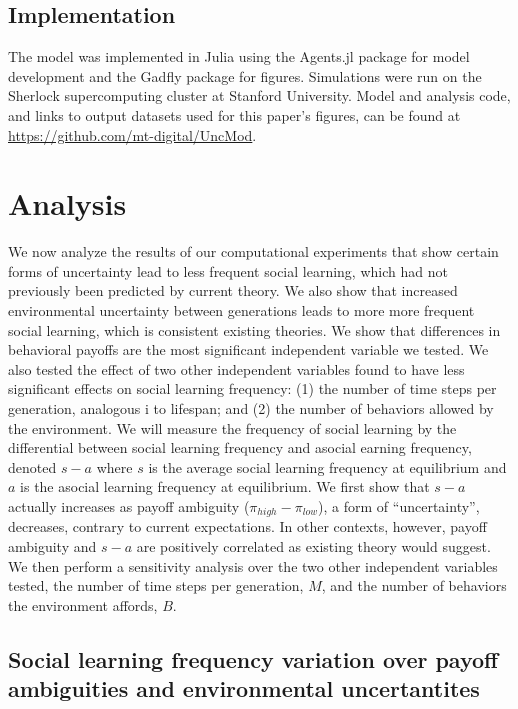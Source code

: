 \documentclass[10pt,letterpaper]{article}
\begin{document}
\subsection{Implementation}

The model was implemented in Julia using the Agents.jl package for model development
and the Gadfly package for figures. Simulations were run on the Sherlock supercomputing
cluster at Stanford University. Model and analysis code, and links to output 
datasets used for this paper's figures, can be found 
at \url{https://github.com/mt-digital/UncMod}.


\section{Analysis}


We now analyze the results of our computational experiments that show certain forms
of uncertainty lead to less frequent social learning, which had not previously been
predicted by current theory. We also show that increased environmental
uncertainty between generations leads to more more frequent social learning,
which is consistent existing theories. We show that differences in behavioral payoffs
are the most significant independent variable we tested. We also tested the effect
of two other independent variables found to have less significant effects on
social learning frequency: (1) the number of time steps per generation, analogous i
to lifespan; and (2) the number of behaviors allowed by the environment. 
We will measure the frequency of social learning by the differential between
social learning frequency and asocial earning frequency, denoted $s - a$ where
$s$ is the average social learning frequency at equilibrium and $a$ is the 
asocial learning frequency at equilibrium. We first show that $s-a$ actually
increases as payoff ambiguity ($\pi_{high} - \pi_{low}$), a form of ``uncertainty'',
decreases, contrary to current expectations. In other contexts, however, 
payoff ambiguity and $s-a$ are positively correlated as existing theory would
suggest. We then perform a sensitivity analysis over the two other independent
variables tested, the number of time steps per generation, $M$, and the number
of behaviors the environment affords, $B$.
 
\subsection{Social learning frequency variation over payoff 
  ambiguities and environmental uncertantites}
  \vspace{0.5em}
\end{document}
